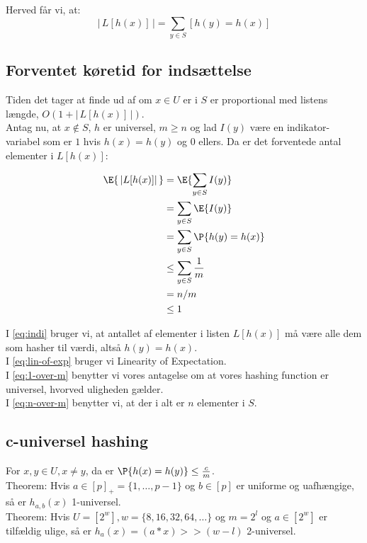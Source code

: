 Herved får vi, at:
$$
| \, L[h(x)] \, | = \sum_{y \in S} [h(y) = h(x)]
$$

\subsection{Forventet køretid for indsættelse}
Tiden det tager at finde ud af om $x \in U$ er i $S$ er proportional med listens længde, $O(1 + | \, L[h(x)] \, |)$.\\

Antag nu, at $x \notin S$, $h$ er universel, $m \geq n$ og lad $I(y)$ være en indikator-variabel som er $1$ hvis $h(x) = h(y)$ og $0$ ellers. Da er det forventede antal elementer i $L[h(x)]$:

\begin{align}
  \E{ \, |L[h(x)]| \, }
  &= \E{ \sum_{y \in S} I(y)} \label{eq:indi} \\
  &= \sum_{y \in S} \E{I(y)} \label{eq:lin-of-exp} \\
  &= \sum_{y \in S} \P{h(y) = h(x)} \nonumber \\
  &\leq \sum_{y \in S} \frac{1}{m} \label{eq:1-over-m} \\
  &= n/m \label{eq:n-over-m} \\
  &\leq 1 \nonumber
\end{align}

I \cref{eq:indi} bruger vi, at antallet af elementer i listen $L[h(x)]$ må være alle dem som hasher til værdi, altså $h(y) = h(x)$.\\
I \cref{eq:lin-of-exp} bruger vi Linearity of Expectation.\\
I \cref{eq:1-over-m} benytter vi vores antagelse om at vores hashing function er universel, hvorved uligheden gælder.\\
I \cref{eq:n-over-m} benytter vi, at der i alt er $n$ elementer i $S$.


\subsection{c-universel hashing}

For $x, y \in U, x \neq y$, da er $\P{h(x) = h(y)} \leq \frac{c}{m}$.\\

Theorem: Hvis $a \in [p]_+ = \{1, \dots, p-1 \}$ og $b \in [p]$ er uniforme og uafhængige, så er $h_{a,b}(x)$ 1-universel.\\

Theorem: Hvis $U = [2^w], w = \{8, 16, 32, 64, \dots \}$ og $m = 2^l$ og $a \in [2^w]$ er tilfældig ulige, så er $h_a(x) = (a*x) >> (w-l)$ 2-universel.


